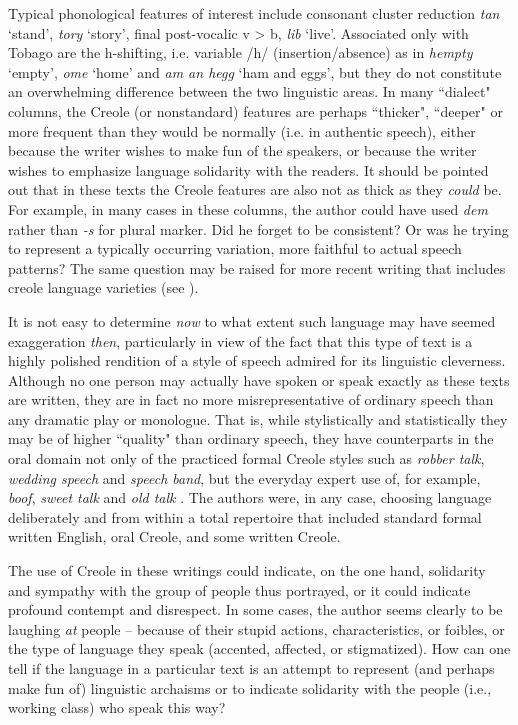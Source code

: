 \documentclass[output=paper,colorlinks,citecolor=brown]{langscibook}
\begin{document}
\largerpage
Typical phonological features of interest include consonant cluster reduction \textit{tan} ‘stand’, \textit{tory} ‘story’, final post-vocalic v > b, \textit{lib} ‘live’.
Associated only with Tobago are the h-shifting, i.e. variable /h/ (insertion/absence) as in \textit{hempty} ‘empty’, \textit{ome} ‘home’ and \textit{am an hegg} ‘ham and eggs’, but they do not constitute an overwhelming difference between the two linguistic areas. In many ``dialect" columns, the Creole (or nonstandard) features are perhaps ``thicker", ``deeper" or more frequent than they would be normally (i.e. in authentic speech), either because the writer wishes to make fun of the speakers, or because the writer wishes to emphasize language solidarity with the readers.  It should be pointed out that in these texts the Creole features are also not as thick as they \textit{could} be.  For example, in many cases in these columns, the author could have used \textit{dem} rather than \textit{-s} for plural marker.  Did he forget to be consistent?  Or was he trying to represent a typically occurring variation, more faithful to actual speech patterns?  The same question may be raised for more recent writing that includes creole language varieties (see \citealt{Bakerwiner1999}).

It is not easy to determine \textit{now} to what extent such language may have seemed exaggeration \textit{then}, particularly in view of the fact that this type of text is a highly polished rendition of a style of speech admired for its linguistic cleverness.  Although no one person may actually have spoken or speak exactly as these texts are written, they are in fact no more misrepresentative of ordinary speech than any dramatic play or monologue.  That is, while stylistically and statistically they may be of higher ``quality" than ordinary speech, they have counterparts in the oral domain not only of the practiced formal Creole styles such as \textit{robber talk}, \textit{wedding speech} and \textit{speech band}, but the everyday expert use of, for example, \textit{boof}, \textit{sweet talk} and \textit{old talk} \citep[57--58]{winer1993}.  The authors were, in any case, choosing language deliberately and from within a total repertoire that included standard formal written English, oral Creole, and some written Creole.

The use of Creole in these writings could indicate, on the one hand, solidarity and sympathy with the group of people thus portrayed, or it could indicate profound contempt and disrespect.  In some cases, the author seems clearly to be laughing \textit{at} people – because of their stupid actions, characteristics, or foibles, or the type of language they speak (accented, affected, or stigmatized).  How can one tell if the language in a particular text is an attempt to represent (and perhaps make fun of) linguistic archaisms or to indicate solidarity with the people (i.e., working class) who speak this way?  
\end{document}
